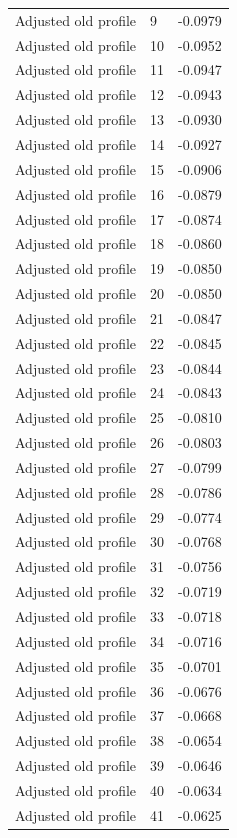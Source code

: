 \begin{table}[htbp]
\begin{tabular}{lll}
Adjusted old profile & 9 & -0.0979 \\
Adjusted old profile & 10 & -0.0952 \\
Adjusted old profile & 11 & -0.0947 \\
Adjusted old profile & 12 & -0.0943 \\
Adjusted old profile & 13 & -0.0930 \\
Adjusted old profile & 14 & -0.0927 \\
Adjusted old profile & 15 & -0.0906 \\
Adjusted old profile & 16 & -0.0879 \\
Adjusted old profile & 17 & -0.0874 \\
Adjusted old profile & 18 & -0.0860 \\
Adjusted old profile & 19 & -0.0850 \\
Adjusted old profile & 20 & -0.0850 \\
Adjusted old profile & 21 & -0.0847 \\
Adjusted old profile & 22 & -0.0845 \\
Adjusted old profile & 23 & -0.0844 \\
Adjusted old profile & 24 & -0.0843 \\
Adjusted old profile & 25 & -0.0810 \\
Adjusted old profile & 26 & -0.0803 \\
Adjusted old profile & 27 & -0.0799 \\
Adjusted old profile & 28 & -0.0786 \\
Adjusted old profile & 29 & -0.0774 \\
Adjusted old profile & 30 & -0.0768 \\
Adjusted old profile & 31 & -0.0756 \\
Adjusted old profile & 32 & -0.0719 \\
Adjusted old profile & 33 & -0.0718 \\
Adjusted old profile & 34 & -0.0716 \\
Adjusted old profile & 35 & -0.0701 \\
Adjusted old profile & 36 & -0.0676 \\
Adjusted old profile & 37 & -0.0668 \\
Adjusted old profile & 38 & -0.0654 \\
Adjusted old profile & 39 & -0.0646 \\
Adjusted old profile & 40 & -0.0634 \\
Adjusted old profile & 41 & -0.0625 \\

\end{tabular}
\end{table}
